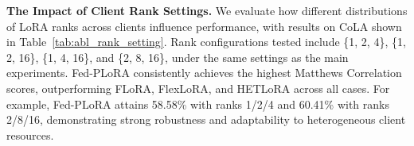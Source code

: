 \documentclass{article} %
\begin{document}
\begin{table}[h]
  \centering
  \caption{The impacts of the heterogeneous rank setting.}
  \renewcommand{\arraystretch}{1.2} 
  \label{tab:abl_rank_setting}
\end{table}

\textbf{The Impact of Client Rank Settings.} We evaluate how different distributions of LoRA ranks across clients influence performance, with results on CoLA shown in Table~\ref{tab:abl_rank_setting}. Rank configurations tested include \{1, 2, 4\}, \{1, 2, 16\}, \{1, 4, 16\}, and \{2, 8, 16\}, under the same settings as the main experiments. Fed-PLoRA consistently achieves the highest Matthews Correlation scores, outperforming FLoRA, FlexLoRA, and HETLoRA across all cases. For example, Fed-PLoRA attains 58.58\% with ranks 1/2/4 and 60.41\% with ranks 2/8/16, demonstrating strong robustness and adaptability to heterogeneous client resources. 
\end{document}
